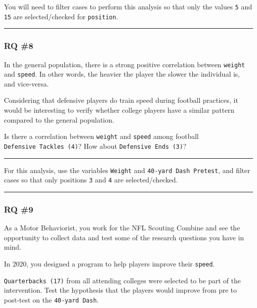 \documentclass[
]{article}
\begin{document}
You will need to filter cases to perform this analysis so that only the values \texttt{5} and \texttt{15} are selected/checked for \texttt{position}.

\begin{center}\rule{0.5\linewidth}{0.5pt}\end{center}

\hypertarget{rq-8}{%
\subsubsection{RQ \#8}\label{rq-8}}

In the general population, there is a strong positive correlation between \texttt{weight} and \texttt{speed}. In other words, the heavier the player the slower the individual is, and vice-versa.

Considering that defensive players do train speed during football practices, it would be interesting to verify whether college players have a similar pattern compared to the general population.

Is there a correlation between \texttt{weight} and \texttt{speed} among football \texttt{Defensive\ Tackles\ (4)}? How about \texttt{Defensive\ Ends\ (3)}?

\begin{center}\rule{0.5\linewidth}{0.5pt}\end{center}

For this analysis, use the variables \texttt{Weight} and \texttt{40-yard\ Dash\ Pretest}, and filter cases so that only positions \texttt{3} and \texttt{4} are selected/checked.

\begin{center}\rule{0.5\linewidth}{0.5pt}\end{center}

\hypertarget{rq-9}{%
\subsubsection{RQ \#9}\label{rq-9}}

As a Motor Behaviorist, you work for the NFL Scouting Combine and see the opportunity to collect data and test some of the research questions you have in mind.

In 2020, you designed a program to help players improve their \texttt{speed}.

\texttt{Quarterbacks\ (17)} from all attending colleges were selected to be part of the intervention. Test the hypothesis that the players would improve from pre to post-test on the \texttt{40-yard\ Dash}.
\end{document}
